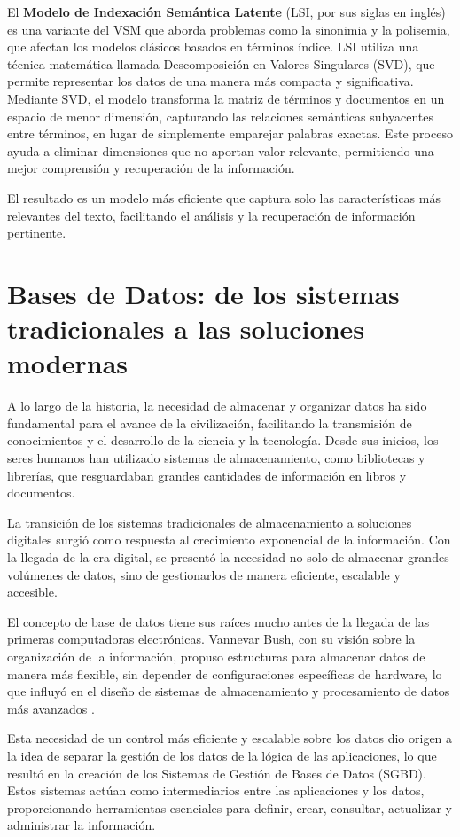 El \textbf{Modelo de Indexación Semántica Latente} (LSI, por sus siglas en inglés) 
es una variante del VSM que aborda problemas como la sinonimia y la polisemia, 
que afectan los modelos clásicos basados en términos índice. LSI utiliza una 
técnica matemática llamada Descomposición en Valores Singulares (SVD), que permite 
representar los datos de una manera más compacta y significativa. Mediante SVD, 
el modelo transforma la matriz de términos y documentos en un espacio de menor 
dimensión, capturando las relaciones semánticas subyacentes entre términos, 
en lugar de simplemente emparejar palabras exactas. Este proceso ayuda a eliminar 
dimensiones que no aportan valor relevante, permitiendo una mejor comprensión y 
recuperación de la información.

El resultado es un modelo más eficiente que captura solo las características más 
relevantes del texto, facilitando el análisis y la recuperación de información pertinente.



\section{Bases de Datos: de los sistemas tradicionales a las soluciones modernas}
A lo largo de la historia, la necesidad de almacenar y organizar datos ha sido fundamental 
para el avance de la civilización, facilitando la transmisión de conocimientos y el 
desarrollo de la ciencia y la tecnología. Desde sus inicios, los seres humanos han 
utilizado sistemas de almacenamiento, como bibliotecas y librerías, que resguardaban 
grandes cantidades de información en libros y documentos.

La transición de los sistemas tradicionales de almacenamiento a soluciones digitales 
surgió como respuesta al crecimiento exponencial de la información. Con la llegada 
de la era digital, se presentó la necesidad no solo de almacenar grandes volúmenes 
de datos, sino de gestionarlos de manera eficiente, escalable y accesible.

El concepto de base de datos tiene sus raíces mucho antes de la llegada de las primeras 
computadoras electrónicas. Vannevar Bush, con su visión sobre la organización de la 
información, propuso estructuras para almacenar datos de manera más flexible, 
sin depender de configuraciones específicas de hardware, lo que influyó en el diseño 
de sistemas de almacenamiento y procesamiento de datos más avanzados \cite{Taylor2001}.

Esta necesidad de un control más eficiente y escalable sobre los datos dio origen 
a la idea de separar la gestión de los datos de la lógica de las aplicaciones, 
lo que resultó en la creación de los Sistemas de Gestión de Bases de Datos (SGBD). 
Estos sistemas actúan como intermediarios entre las aplicaciones y los datos, 
proporcionando herramientas esenciales para definir, crear, consultar, actualizar y 
administrar la información.


